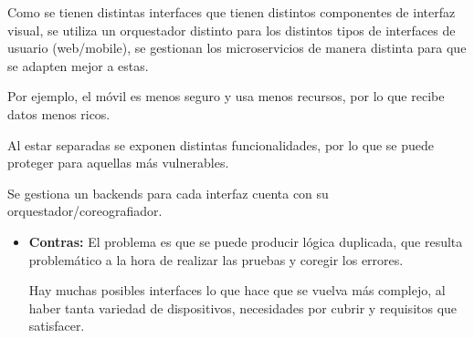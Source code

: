 \documentclass[12pt]{report} %
\begin{document}
Como se tienen distintas interfaces que tienen distintos componentes de interfaz visual, se utiliza un orquestador distinto para los distintos tipos de interfaces de usuario (web/mobile), se gestionan los microservicios de manera distinta para que se adapten mejor a estas.

Por ejemplo, el móvil es menos seguro y usa menos recursos, por lo que recibe datos menos ricos.

Al estar separadas se exponen distintas funcionalidades, por lo que se puede proteger para aquellas más vulnerables.

Se gestiona un backends para cada interfaz cuenta con su orquestador/coreografiador.

\begin{itemize}
	\item \textbf{Contras:} El problema es que se puede producir lógica duplicada, que resulta problemático a la hora de realizar las pruebas y coregir los errores.

	Hay muchas posibles interfaces lo que hace que se vuelva más complejo, al haber tanta variedad de dispositivos, necesidades por cubrir y requisitos que satisfacer.
\end{itemize}	
\end{document}
